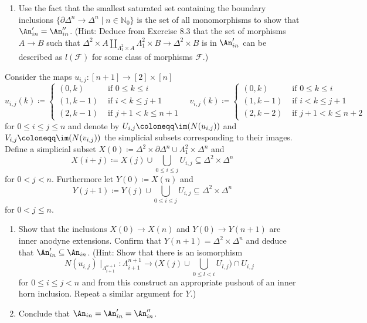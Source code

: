 \begin{Exercise}
\begin{enumerate}[label=(\alph*)]
		\item 
		Use the fact that the smallest saturated set containing the boundary inclusions $ \{ \partial \Delta^n \to \Delta^n \mid n \in \mathbb{ N }_0 \} $ is the set of all monomorphisms to show that $ \An'_{ in } = \An''_{ in } $.
		(Hint: Deduce from Exercise 8.3 that the set of morphisms $ A \to B $ such that $ \Delta^2 \times A \amalg_{ \Lambda_1^2 \times A } \Lambda_1^2 \times B \to \Delta^2 \times B $
		is in $ \An'_{ in } $ can be described as $ l ( \mathcal{ F } ) $ for some class of morphisms $ \mathcal{ F } $.)
	\end{enumerate}
	Consider the maps $ u_{ i , j  } \colon \left[ n + 1 \right] \to \left[ 2 \right] \times \left[ n \right] $
	\[
	u_{ i , j } ( k ) 
	\coloneqq
	\begin{cases}
		( 0 , k ) & \text{ if } 0 \leq k \leq i 
		\\
		( 1 , k - 1 ) & \text{ if } i < k \leq j + 1 
		\\
		( 2 , k - 1 ) & \text{ if } j + 1 < k \leq n + 1
	\end{cases}
	\quad
	v_{ i , j } ( k )
	\coloneqq
	\begin{cases}
		( 0 , k ) & \text{ if } 0 \leq k \leq i 
		\\
		( 1 , k - 1 ) & \text{ if } i < k \leq j + 1 
		\\
		( 2 , k - 2 ) & \text{ if } j + 1 < k \leq n + 2 
	\end{cases}
	\]
	for $ 0 \leq i \leq j \leq n $ and denote by $ U_{ i , j } \coloneqq \im ( N ( u_{ i , j } ) ) $ and $ V_{ i , j } \coloneqq \im ( N ( v_{ i , j } ) ) $ the simplicial subsets corresponding to their images.
	Define a simplicial subset $ X ( 0 ) \coloneqq \Delta^2 \times \partial \Delta^n \cup \Lambda^2_1 \times \Delta^n $ and 
	\[
	X ( i + j ) 
	\coloneqq 
	X ( j ) \cup \bigcup_{ 0 \leq  i \leq j } U_{ i , j } \subseteq \Delta^2 \times \Delta^n
	\]
	for $ 0 < j < n .$
	Furthermore let $ Y ( 0 ) \coloneqq X ( n ) $ and
	\[
	Y ( j + 1 ) 
	\coloneqq 
	Y ( j ) \cup \bigcup_{ 0 \leq i \leq j } U_{ i , j } \subseteq \Delta^2 \times \Delta^n
	\]
	for $ 0 < j \leq n $.
	
	\begin{enumerate}[label=(\alph*), resume]
		\item 
		Show that the inclusions $ X ( 0 ) \to X ( n ) $ and $ Y ( 0 ) \to Y ( n + 1 ) $ are inner anodyne extensions.
		Confirm that $ Y ( n + 1 ) = \Delta^2 \times \Delta^n $ and deduce that $ \An'_{ in } \subseteq \An_{ in } $.
		\newline
		(Hint: Show that there is an isomorphism
		\[
		N ( u_{ i , j } ) \mid_{ \Lambda_{ i + 1 }^{ n + 1 } } 
		\colon
		\Lambda_{ i + 1 }^{ n + 1 } 
		\to 
		\bigg( X ( j ) \cup \bigcup_{ 0 \leq l < i } U_{ l , j } \bigg) \cap U_{ i , j }
		\]
		for $ 0 \leq i \leq j < n $ and from this construct an appropriate pushout of an inner horn inclusion. Repeat a similar argument for $ Y $.)
		
		\item 
		Conclude that $ \An_{ in } = \An'_{ in } = \An''_{ in } $.
	\end{enumerate}
\end{Exercise}


